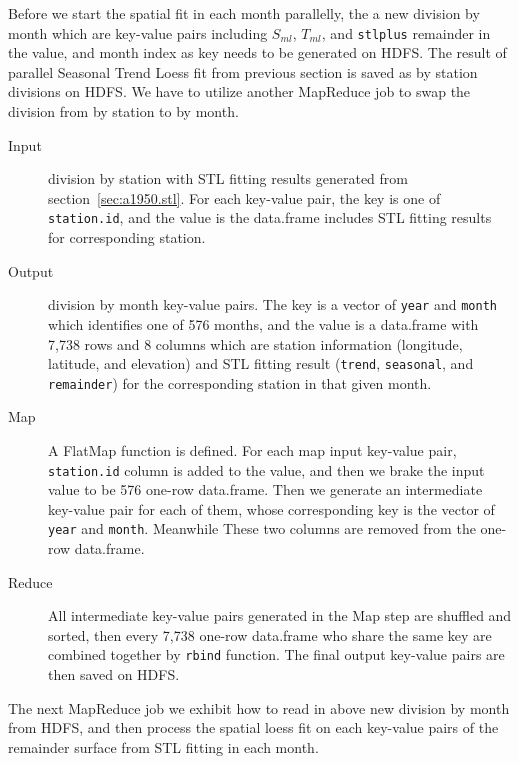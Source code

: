 Before we start the spatial fit in each month parallelly, the a new division by
month which are key-value pairs including $S_{ml}$, $T_{ml}$, and \texttt{stlplus} 
remainder in the value, and month index as key needs to be generated on HDFS.
The result of parallel Seasonal Trend Loess fit from previous section is saved
as by station divisions on HDFS. We have to utilize another MapReduce job to 
swap the division from by station to by month.

\begin{description}
  \item[Input] division by station with STL fitting results generated from 
  section~\ref{sec:a1950.stl}. For each key-value pair, the key is one of 
  \texttt{station.id}, and the value is the data.frame includes STL fitting 
  results for corresponding station.
  \item[Output] division by month key-value pairs. The key is a vector of 
  \texttt{year} and \texttt{month} which identifies one of 576 months, and the 
  value is a data.frame with 7,738 rows and 8 columns which are station 
  information (longitude, latitude, and elevation) and STL fitting result 
  (\texttt{trend}, \texttt{seasonal}, and \texttt{remainder}) for the 
  corresponding station in that given month.
  \item[Map] A FlatMap function is defined. For each map input key-value pair, 
  \texttt{station.id} column is added to the value, and then we brake the input 
  value to be 576 one-row data.frame. Then we generate an intermediate key-value 
  pair for each of them, whose corresponding key is the vector of \texttt{year} 
  and \texttt{month}. Meanwhile These two columns are removed from the one-row 
  data.frame.   
  \item[Reduce] All intermediate key-value pairs generated in the Map step are 
  shuffled and sorted, then every 7,738 one-row data.frame who share the same 
  key are combined together by \texttt{rbind} function. The final output key-value
  pairs are then saved on HDFS.
\end{description}

The next MapReduce job we exhibit how to read in above new division by month from 
HDFS, and then process the spatial loess fit on each key-value pairs of the 
remainder surface from STL fitting in each month.

